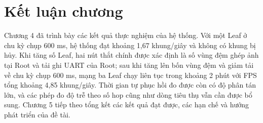 \section{Kết luận chương}

Chương 4 đã trình bày các kết quả thực nghiệm của hệ thống. Với một Leaf ở chu kỳ chụp 600 ms, hệ thống đạt khoảng 1,67 khung/giây và không có khung bị hủy. Khi tăng số Leaf, hai nút thắt chính được xác định là số vùng đệm ghép ảnh tại Root và tải ghi UART của Root; sau khi tăng lên bốn vùng đệm và giảm tải về chu kỳ chụp 600 ms, mạng ba Leaf chạy liên tục trong khoảng 2 phút với FPS tổng khoảng 4,85 khung/giây. Thời gian tự phục hồi đo được còn có độ phân tán lớn, và các phép đo độ trễ theo số hop cũng như dòng tiêu thụ vẫn cần được bổ sung. Chương 5 tiếp theo tổng kết các kết quả đạt được, các hạn chế và hướng phát triển của đề tài.
